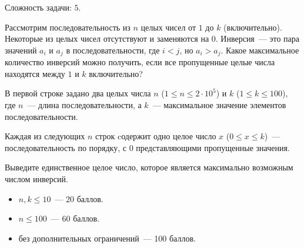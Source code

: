 
\Legend
Сложность задачи: $5$.

Рассмотрим последовательность из $n$ целых чисел от $1$ до $k$ (включительно). Некоторые из целых чисел отсутствуют и заменяются на $0$.
Инверсия~--- это пара значений $a_i$ и $a_j$ в последовательности, где $i < j$, но $a_i > a_j$. Какое максимальное количество
инверсий можно получить, если все пропущенные целые числа находятся между $1$ и $k$ включительно?

\Input
В первой строке задано два целых числа $n$ ($1 \le n \le 2 \cdot 10^5$) и $k$ ($1 \le k \le 100$), где $n$~---
длина последовательности, а $k$~--- максимальное значение элементов последовательности.

Каждая из следующих $n$ строк cодержит одно целое число $x$ ($0 \le x \le k$)~--- последовательность по порядку, с $0$
представляющими пропущенные значения.

\Output
Выведите единственное целое число, которое является максимально возможным числом инверсий.

\Samples
\BeginTests
\EndTests

\Scoring
\begin{itemize}
	\item $n, k \le 10$~--- 20 баллов.
	\item $n \le 100$~--- 60 баллов.
	\item без дополнительных ограничений~--- 100 баллов.
\end{itemize}

\EndProblem
